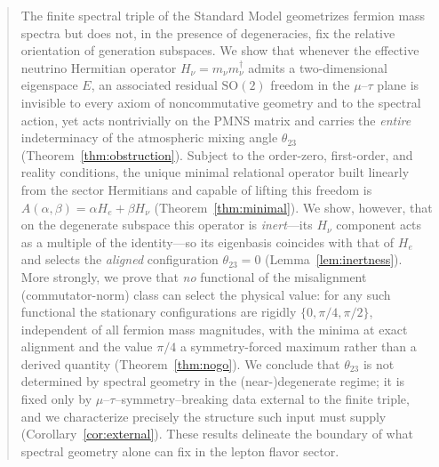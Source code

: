 %
%


\begin{abstract}
The finite spectral triple of the Standard Model geometrizes fermion mass
spectra but does not, in the presence of degeneracies, fix the relative
orientation of generation subspaces. We show that whenever the effective
neutrino Hermitian operator $H_\nu = m_\nu m_\nu^\dagger$ admits a
two-dimensional eigenspace $E$, an associated residual $\mathrm{SO}(2)$ freedom
in the $\mu$--$\tau$ plane is invisible to every axiom of noncommutative
geometry and to the spectral action, yet acts nontrivially on the PMNS matrix
and carries the \emph{entire} indeterminacy of the atmospheric mixing angle
$\theta_{23}$ (Theorem~\ref{thm:obstruction}). Subject to the order-zero,
first-order, and reality conditions, the unique minimal relational operator
built linearly from the sector Hermitians and capable of lifting this freedom
is $A(\alpha,\beta)=\alpha H_e+\beta H_\nu$
(Theorem~\ref{thm:minimal}). We show, however, that on the degenerate subspace
this operator is \emph{inert}---its $H_\nu$ component acts as a multiple of the
identity---so its eigenbasis coincides with that of $H_e$ and selects the
\emph{aligned} configuration $\theta_{23}=0$
(Lemma~\ref{lem:inertness}). More strongly, we prove that \emph{no} functional
of the misalignment (commutator-norm) class can select the physical value: for
any such functional the stationary configurations are rigidly
$\{0,\pi/4,\pi/2\}$, independent of all fermion mass magnitudes, with the
minima at exact alignment and the value $\pi/4$ a symmetry-forced maximum
rather than a derived quantity (Theorem~\ref{thm:nogo}). We conclude that
$\theta_{23}$ is not determined by spectral geometry in the (near-)degenerate
regime; it is fixed only by $\mu$--$\tau$--symmetry--breaking data external to
the finite triple, and we characterize precisely the structure such input must
supply (Corollary~\ref{cor:external}). These results delineate the boundary of
what spectral geometry alone can fix in the lepton flavor sector.
\end{abstract}


